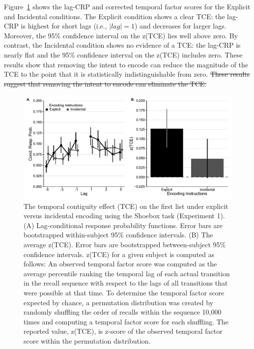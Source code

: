 \documentclass[man,natbib,floatsintext]{apa6} %
\begin{document}
Figure~\ref{e1_l1_crp} shows the lag-CRP and corrected temporal factor scores for the Explicit and Incidental conditions. The Explicit condition shows a clear TCE: the lag-CRP is highest for short lags (i.e., $|lag|=1$) and decreases for larger lags. Moreover, the 95\% confidence interval on the z(TCE) lies well above zero. By contrast, the Incidental condition shows no evidence of a TCE: the lag-CRP is nearly flat and the 95\% confidence interval on the z(TCE) includes zero. \color{red} These results show that removing the intent to encode can reduce the magnitude of the TCE to the point that it is statistically indistinguishable from zero.\color{black}  \st{These results suggest that removing the intent to encode can eliminate the TCE.}



\newcommand\paneltext{(A) Lag-conditional response probability functions. Error bars are bootstrapped within-subject 95\% confidence intervals. (B) The average z(TCE).  Error bars are bootstrapped between-subject 95\% confidence intervals. z(TCE) for a given subject is computed as follows: An observed temporal factor score was computed as the average percentile ranking the temporal lag of each actual transition in the recall sequence with respect to the lags of all transitions that were possible at that time. To determine the temporal factor score expected by chance, a permutation distribution was created by randomly shuffling the order of recalls within the sequence 10,000 times and computing a temporal factor score for each shuffling. The reported value, z(TCE), is z-score of the observed temporal factor score within the permutation distribution.}
\begin{figure}
\includegraphics{figures/E1_crp_list1.pdf}
\caption{The temporal contiguity effect (TCE) on the first list under explicit versus incidental encoding using the Shoebox task (Experiment 1). \paneltext}
\label{e1_l1_crp}
\end{figure}
\end{document}
